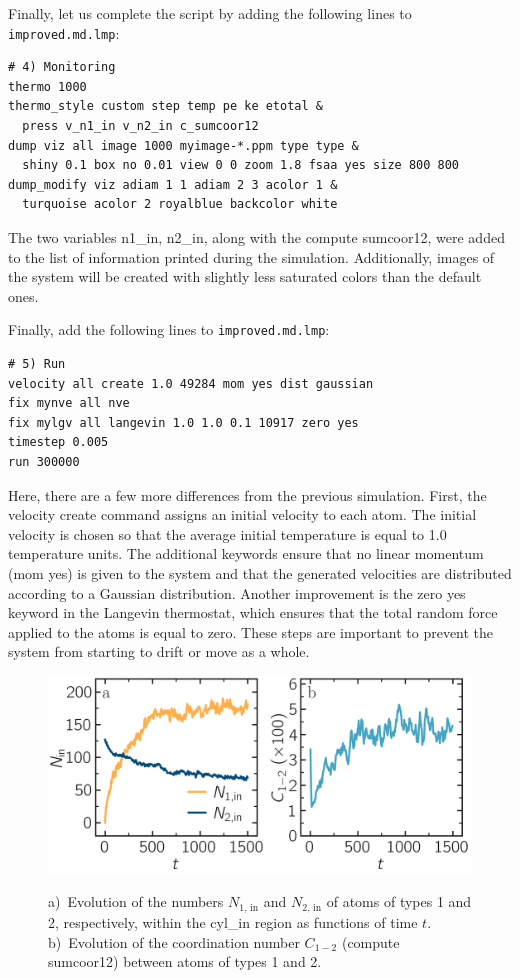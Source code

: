 \documentclass[9pt,tutorial]{livecoms}
\newcommand{\lmpcmd}[1]{\colorbox{listing}{\textcolor{command}{\small{#1}}}} %
\newcommand{\flecmd}[1]{\textcolor{command}{\texttt{#1}}} %
\begin{document}
Finally, let us complete the script by adding the following lines to
\flecmd{improved.md.lmp}:
\begin{lstlisting}
# 4) Monitoring
thermo 1000
thermo_style custom step temp pe ke etotal &
  press v_n1_in v_n2_in c_sumcoor12
dump viz all image 1000 myimage-*.ppm type type &
  shiny 0.1 box no 0.01 view 0 0 zoom 1.8 fsaa yes size 800 800
dump_modify viz adiam 1 1 adiam 2 3 acolor 1 &
  turquoise acolor 2 royalblue backcolor white
\end{lstlisting}
The two variables \lmpcmd{n1\_in}, \lmpcmd{n2\_in}, along with the compute
\lmpcmd{sumcoor12}, were added to the list of information printed during
the simulation.  Additionally, images of the system will be created with
slightly less saturated colors than the default ones.

Finally, add the following lines to \flecmd{improved.md.lmp}:
\begin{lstlisting}
# 5) Run
velocity all create 1.0 49284 mom yes dist gaussian
fix mynve all nve
fix mylgv all langevin 1.0 1.0 0.1 10917 zero yes
timestep 0.005
run 300000
\end{lstlisting}
Here, there are a few more differences from the previous simulation.
First, the \lmpcmd{velocity create} command assigns an initial velocity
to each atom.  The initial velocity is chosen so that the average
initial temperature is equal to 1.0 temperature units.  The additional
keywords ensure that no linear momentum (\lmpcmd{mom yes}) is given to
the system and that the generated velocities are distributed according
to a Gaussian distribution.  Another improvement is the \lmpcmd{zero
  yes} keyword in the Langevin thermostat, which ensures that the total
random force applied to the atoms is equal to zero. These steps are
important to prevent the system from starting to drift or move as a
whole.

\begin{figure}
\centering
\includegraphics[width=\linewidth]{LJ-mixing}\\[-2ex]
\caption{a)~Evolution of the numbers $N_\text{1, in}$ and $N_\text{2, in}$ of atoms
of types 1 and 2, respectively, within the \lmpcmd{cyl\_in} region as functions
of time $t$.  b)~Evolution of the coordination number $C_{1-2}$ (compute \lmpcmd{sumcoor12})
between atoms of types 1 and 2.}
\label{fig:mixing}
\end{figure}
\end{document}
